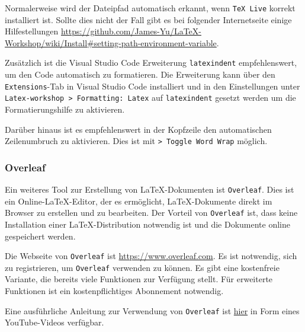 Normalerweise wird der Dateipfad automatisch erkannt, wenn \texttt{TeX Live} korrekt installiert ist. Sollte dies nicht der Fall gibt es bei folgender Internetseite einige Hilfestellungen \newline \href{https://github.com/James-Yu/LaTeX-Workshop/wiki/Install#setting-path-environment-variable}{https://github.com/James-Yu/LaTeX-Workshop/wiki/Install\#setting-path-environment-variable}.

Zusätzlich ist die Visual Studio Code Erweiterung \texttt{latexindent} empfehlenswert, um den Code automatisch zu formatieren. Die Erweiterung kann über den \texttt{Extensions}-Tab in Visual Studio Code installiert und in den Einstellungen unter \texttt{Latex-workshop > Formatting: Latex} auf \texttt{latexindent} gesetzt werden um die Formatierungshilfe zu aktivieren.

Darüber hinaus ist es empfehlenswert in der Kopfzeile den automatischen Zeilenumbruch zu aktivieren. Dies ist mit \texttt{> Toggle Word Wrap} möglich.


\subsubsection{Overleaf}
\label{sec:overleaf}
Ein weiteres Tool zur Erstellung von \LaTeX{}-Dokumenten ist \texttt{Overleaf}. Dies ist ein Online-\LaTeX{}-Editor, der es ermöglicht, \LaTeX{}-Dokumente direkt im Browser zu erstellen und zu bearbeiten. Der Vorteil von \texttt{Overleaf} ist, dass keine Installation einer \LaTeX{}-Distribution notwendig ist und die Dokumente online gespeichert werden.

Die Webseite von \texttt{Overleaf} ist \href{https://www.overleaf.com}{https://www.overleaf.com}. Es ist notwendig, sich zu registrieren, um \texttt{Overleaf} verwenden zu können. Es gibt eine kostenfreie Variante, die bereits viele Funktionen zur Verfügung stellt. Für erweiterte Funktionen ist ein kostenpflichtiges Abonnement notwendig.

Eine ausführliche Anleitung zur Verwendung von \texttt{Overleaf} ist \href{https://youtu.be/lgiCpA4zzGU?si=xZJ08u8SgERr0tuz}{hier} in Form eines YouTube-Videos verfügbar.

\newpage